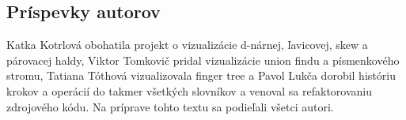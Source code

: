 \subsection{Príspevky autorov}
Katka Kotrlová obohatila projekt o vizualizácie d-nárnej, ľavicovej, skew a
párovacej haldy, Viktor Tomkovič pridal vizualizácie union findu a písmenkového
stromu, Tatiana Tóthová vizualizovala finger tree a Pavol Lukča dorobil históriu
krokov a operácií do takmer všetkých slovníkov a venoval sa refaktorovaniu
zdrojového kódu. Na príprave tohto textu sa podieľali všetci autori.

